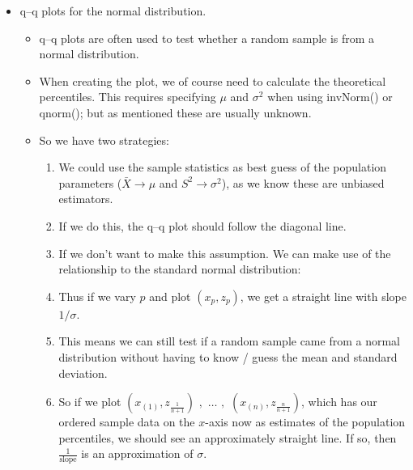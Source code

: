 \documentclass{article}
\newcommand{\order}[2]{#1_{(#2)}}		%
\begin{document}
\begin{itemize}
    \item q--q plots for the normal distribution.
    \begin{itemize}
        \item q--q plots are often used to test whether a random sample is from a normal distribution.
        \item When creating the plot, we of course need to calculate the theoretical percentiles. This requires specifying $\mu$ and $\sigma^2$ when using invNorm() or qnorm(); but as mentioned these are usually unknown. 
        \item[] So we have two strategies:
        \begin{enumerate}
            \item We could use the sample statistics as best guess of the population parameters ($\bar{X} \rightarrow \mu$ and $S^2 \rightarrow \sigma^2$), as we know these are unbiased estimators. 
            \item[] If we do this, the q--q plot should follow the diagonal line.\bigskip
            \item If we don't want to make this assumption. We can make use of the relationship to the standard normal distribution:\vspace{50pt}
            \item[] Thus if we vary $p$ and plot $(x_p, z_p)$, we get a straight line with slope $1 / \sigma$.\vspace{100pt}
            \item[] This means we can still test if a random sample came from a normal distribution without having to know / guess the mean and standard deviation.
            \item[] So if we plot $(\order{x}{1}, z_{\frac{1}{n+1}}) \,\, , \,\, \ldots \,\, , \,\, (\order{x}{n}, z_{\frac{n}{n+1}})$, which has our ordered sample data on the $x$-axis now as estimates of the population percentiles, we should see an approximately straight line. If so, then $\frac{1}{\text{slope}}$ is an approximation of $\sigma$.
        \end{enumerate}
    \end{itemize}
\end{itemize}\bigskip
\end{document}
